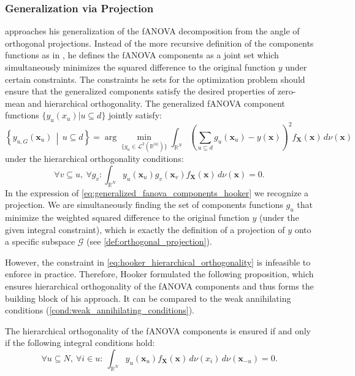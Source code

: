 \subsubsection{Generalization via Projection}
\cite{hooker2007} approaches his generalization of the fANOVA decomposition from the angle of orthogonal projections. Instead of the more recursive definition of the components functions as in \cite{rahman2014}, he defines the fANOVA components as a joint set which simultaneously minimizes the squared difference to the original function $y$ under certain constraints.
The constraints he sets for the optimization problem should ensure that the generalized components satisfy the desired properties of zero-mean and hierarchical orthogonality.
The generalized fANOVA component functions $\{y_u(x_u) | u \subseteq d \}$ jointly satisfy:
\begin{equation}
\left\{ y_{u, G}(\boldsymbol{x}_u) \,\middle|\, u \subseteq d \right\}
= \arg\min_{\{g_u \in \mathcal{L}^2(\mathbb{R}^{|u|})\}} 
\int_{\mathbb{R}^N} \left( \sum_{u \subseteq d} g_u(\boldsymbol{x}_u) - y(\boldsymbol{x}) \right)^2 f_{\boldsymbol{X}}(\boldsymbol{x}) \, d \nu (\boldsymbol{x})
\label{eq:generalized_fanova_components_hooker}
\end{equation}
under the hierarchical orthogonality conditions:
\begin{equation}
    \forall v \subseteq u,\ \forall g_v : \int_{\mathbb{R}^N} y_u(\boldsymbol{x}_u) g_v(\boldsymbol{x}_v) f_{\boldsymbol{X}}(\boldsymbol{x}) \, d \nu (\boldsymbol{x}) = 0.
\label{eq:hooker_hierarchical_orthogonality}
\end{equation}
In the expression of \autoref{eq:generalized_fanova_components_hooker} we recognize a projection. We are simultaneously finding the set of components functions $g_u$ that minimize the weighted squared difference to the original function $y$ (under the given integral constraint), which is exactly the definition of a projection of $y$ onto a specific subspace $\mathcal{G}$ (see \autoref{def:orthogonal_projection}).\par
However, the constraint in \autoref{eq:hooker_hierarchical_orthogonality} is infeasible to enforce in practice. 
Therefore, Hooker formulated the following proposition, which ensures hierarchical orthogonality of the fANOVA components and thus forms the building block of his approach. It can be compared to the weak annihilating conditions (\autoref{cond:weak_annihilating_conditions}).
\begin{proposition}\label{prop:hooker_lemma_1}
    The hierarchical orthogonality of the fANOVA components is ensured if and only if the following integral conditions hold:
    \begin{equation}
\forall u \subseteq N,\ \forall i \in u:\ \int_{\mathbb{R}^N} y_u(\boldsymbol{x}_u) f_{\boldsymbol{X}}(\boldsymbol{x})\, d \nu (x_i)\, d \nu (\boldsymbol{x}_{-u}) = 0.
\end{equation}
\end{proposition}
